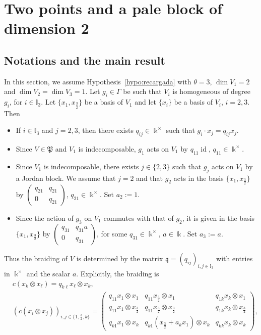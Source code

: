 \documentclass[pdftex]{sigma}
\numberwithin{equation}{section}
\newcommand{\id}{\operatorname{id}}
\newcommand{\pale}{\mathfrak{P}}
\newcommand{\I}{{\mathbb I}}
\newcommand{\bq}{\mathfrak{q}}
\newcommand{\tresdos}{\frac{3}{2}}
\begin{document}
\section{Two points and a pale block of dimension 2}\label{sec:paleblock+2pts}
\subsection{Notations and the main result}%
In this section, we assume Hypothesis~\ref{hypo:recargada} with $\theta = 3$,
$\dim V_1= 2$ and $\dim V_2 = \dim V_3 = 1$.
Let $g_i\in \Gamma$ be such that $V_i$ is homogeneous of degree $g_i$, for $i\in \I_3$.
Let $\big\{x_1, x_{\tresdos}\big\}$ be a basis of $V_1$ and let $\{x_i\}$ be a basis of $V_i$, $i = 2,3$.
Then
\begin{itemize}\itemsep=0pt
\item If $i\in \I_3$ and $j= 2,3$, then there exists $q_{ij} \in \Bbbk^{\times}$ such that $g_i \cdot x_j = q_{ij} x_j$.
\item Since $V \in \pale$ and $V_1$ is indecomposable, $g_1$ acts on $V_1$ by $q_{11} \id$, $q_{11} \in \Bbbk^{\times}$.
\item Since $V_1$ is indecomposable, there exists $j \in \{2,3\}$ such that $g_j$ acts on $V_1$ by a Jordan block. We assume that $j = 2$
and that $g_2$ acts in the basis $\big\{x_1, x_{\tresdos}\big\}$ by
$\left(\begin{smallmatrix} q_{21} & q_{21} \\ 0 & q_{21}\end{smallmatrix}\right)$, $q_{21} \in \Bbbk^{\times}$.
Set $a_2 := 1$.
\item Since the action of $g_3$ on $V_1$ commutes with that of $g_2$,
it is given in the basis $\big\{x_1, x_{\tresdos}\big\}$ by
$\left(\begin{smallmatrix} q_{31} & q_{31}a \\ 0 & q_{31}\end{smallmatrix}\right)$, for some $q_{31} \in \Bbbk^{\times}$, $a \in \Bbbk$.
Set $a_3 := a$.
\end{itemize}
Thus the braiding of $V$ is determined by the matrix $\bq = (q_{ij})_{i,j \in \I_{3}}$ with entries in $\Bbbk^{\times}$
and the scalar $a$.
Explicitly, the braiding is
\begin{align*}%
&c(x_k\otimes x_\ell) = q_{k\ell} x_{\ell} \otimes x_k,
\\
&(c(x_i \otimes x_j))_{i,j\in \{1,\tresdos, k \}} =
\begin{pmatrix}
q_{11} x_1 \otimes x_1& q_{11} x_{\tresdos} \otimes x_1& q_{1k} x_k \otimes x_1
\\
q_{11} x_1 \otimes x_{\tresdos} & q_{11} x_{\tresdos} \otimes x_{\tresdos} & q_{1k} x_k \otimes x_{\tresdos}
\\
q_{k1} x_1 \otimes x_k & q_{k1}(x_{\tresdos} + a_kx_1) \otimes x_k & q_{kk} x_k \otimes x_k
\end{pmatrix}\!,
\end{align*}
\end{document}
